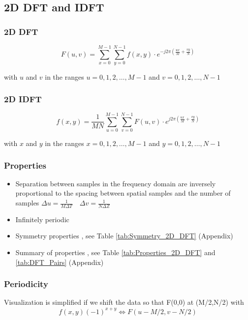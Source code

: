  

\subsection{2D DFT and IDFT }

\subsubsection{2D DFT}
\begin{equation}
    F(u,v) = \sum_{x=0}^{M-1}\sum_{y=0}^{N-1}f(x,y)\cdot e^{-j2\pi \left(\frac{ux}{M}+ \frac{vy}{N}\right)}
\end{equation}
\begin{center}
  with $u$ and $v$ in the ranges $u = 0,1,2,\ldots,M-1$ and $v = 0,1,2,\ldots,N-1$
\end{center}
\subsubsection{2D IDFT}
\begin{equation}
    f(x,y) = \frac{1}{MN} \sum_{u=0}^{M-1}\sum_{v=0}^{N-1}F(u,v)\cdot e^{j2\pi \left(\frac{ux}{M}+ \frac{vy}{N}\right)}
\end{equation}
\begin{center}
  with $x$ and $y$ in the ranges $x = 0,1,2,\ldots,M-1$ and $y = 0,1,2,\ldots,N-1$
\end{center}

\subsubsection{Properties}
\begin{itemize}
\item Separation between samples in the frequency domain are inversely proportional to the spacing between spatial samples and the number of samples
$\Delta u = \frac{1}{M \Delta T} \quad \Delta v = \frac{1}{N \Delta Z}$
\item Infinitely periodic
\item Symmetry properties , see Table \ref{tab:Symmetry_2D_DFT} (Appendix)
\item Summary of properties , see Table \ref{tab:Properties_2D_DFT} and \ref{tab:DFT_Pairs} (Appendix)
\end{itemize}

\subsubsection{Periodicity }
  Visualization is simplified if we shift the data so that F(0,0) at (M/2,N/2) with
    \begin{equation}
      f(x,y)(-1)^{x+y} \Leftrightarrow F(u-M/2, v-N/2)
    \end{equation}
    
